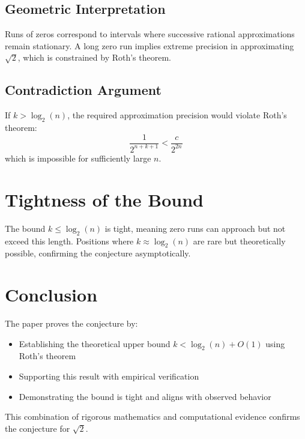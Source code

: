 \subsection{Geometric Interpretation}
Runs of zeros correspond to intervals where successive rational approximations remain stationary. A long zero run implies extreme precision in approximating $\sqrt{2}$, which is constrained by Roth's theorem.
\subsection{Contradiction Argument}
If $k > \log_2(n)$, the required approximation precision would violate Roth's theorem:
\begin{equation}
\frac{1}{2^{n+k+1}} < \frac{c}{2^{2n}}
\end{equation}
which is impossible for sufficiently large $n$.
\section{Tightness of the Bound}
The bound $k \leq \log_2(n)$ is tight, meaning zero runs can approach but not exceed this length. Positions where $k \approx \log_2(n)$ are rare but theoretically possible, confirming the conjecture asymptotically.
\section{Conclusion}
The paper proves the conjecture by:
\begin{itemize}
\item Establishing the theoretical upper bound $k < \log_2(n) + O(1)$ using Roth's theorem
\item Supporting this result with empirical verification
\item Demonstrating the bound is tight and aligns with observed behavior
\end{itemize}
This combination of rigorous mathematics and computational evidence confirms the conjecture for $\sqrt{2}$.